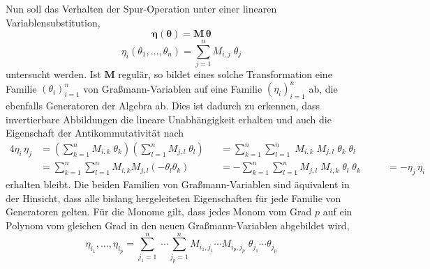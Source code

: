 \noindent Nun soll das Verhalten der Spur-Operation unter einer linearen Variablensubstitution, 
\begin{equation} \label{def: Graßmann_linearTransform_Matrix}
    \bm{\eta}\left(\bm{\theta}\right) = \bm{M}\,\bm{\theta}
\end{equation}
\begin{equation} \label{def: Graßmann_linearTransform}
    \eta_i\left( \theta_1,\dots,\theta_n \right) = \sum_{j=1}^n M_{i,j}\; \theta_j
\end{equation}
untersucht werden. Ist $\bm{M}$ regulär, so bildet eines solche Transformation eine Familie $\left(\theta_i\right)_{i = 1}^n$ von Graßmann-Variablen auf eine Familie $\left(\eta_i\right)_{i = 1}^n$ ab, die ebenfalls Generatoren der Algebra ab. Dies ist dadurch zu erkennen, dass invertierbare Abbildungen die lineare Unabhängigkeit erhalten und auch die Eigenschaft der Antikommutativität nach 
\begin{alignat}{4}
    \eta_i \,\eta_j 
        &= \left(\sum_{k=1}^n M_{i,k} \; \theta_k  \right) \left(\sum_{l=1}^n M_{j,l} \;\theta_l\right)     
        &&= \sum_{k=1}^n \sum_{l=1}^n\; M_{i,k}\; M_{j,l} \;\theta_k \;\theta_l &&& \nonumber \\
        &= \sum_{k=1}^n \sum_{l=1}^n M_{i,k} M_{j,l} \left(-\theta_l \theta_k \right)\
        &&= - \sum_{k=1}^n \sum_{l=1}^n M_{j,l}\; M_{i,k} \;\theta_l \;\theta_k &&&\;= - \eta_j  \,\eta_i \nonumber
\end{alignat}
erhalten bleibt. Die beiden Familien von Graßmann-Variablen sind äquivalent in der Hinsicht, dass alle bislang hergeleiteten Eigenschaften für jede Familie von Generatoren gelten. Für die Monome gilt, dass jedes Monom vom Grad $p$ auf ein Polynom vom gleichen Grad in den neuen Graßmann-Variablen abgebildet wird,
$$ \eta_{i_1}, \dots, \eta_{i_p} = \sum_{{j_1}=1}^n\;\cdots \sum_{{j_p}=1}^n M_{{i_1},{j_1}}\cdots M_{{i_p},{j_p}}\;\theta_{j_1} \cdots \theta_{j_p} $$


